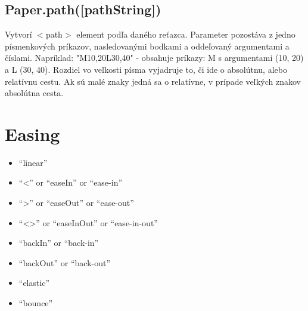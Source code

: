\subsection{Paper.path([pathString])}
Vytvorí $<$path$>$ element podľa daného reťazca. Parameter pozostáva z jedno písmenkových príkazov, nasledovanými bodkami a oddeľovaný argumentami a číslami. 
Napríklad: "M10,20L30,40" - obsahuje príkazy: M s argumentami (10, 20) a L (30, 40). Rozdiel vo veľkosti písma vyjadruje to, či ide o absolútnu, alebo relatívnu cestu. Ak sú malé znaky jedná sa o relatívne, v prípade veľkých znakov absolútna cesta. 
		












\section{Easing}

\begin{itemize}
\item 	“linear”
\item 	“<” or “easeIn” or “ease-in”
\item 	“>” or “easeOut” or “ease-out”
\item 	“<>” or “easeInOut” or “ease-in-out”
\item 	“backIn” or “back-in”
\item 	“backOut” or “back-out”
\item 	“elastic”
\item 	“bounce”
\end{itemize}



